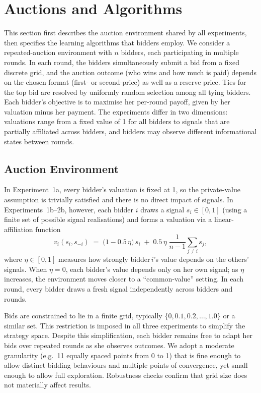 \section{Auctions and Algorithms}
\label{sec:auctions_and_algorithms}
\label{sec:auctions}


This section first describes the auction environment shared by all experiments, then specifies the learning algorithms that bidders employ. We consider a repeated-auction environment with $n$ bidders, each participating in multiple rounds. In each round, the bidders simultaneously submit a bid from a fixed discrete grid, and the auction outcome (who wins and how much is paid) depends on the chosen format (first- or second-price) as well as a reserve price. Ties for the top bid are resolved by uniformly random selection among all tying bidders. Each bidder's objective is to maximise her per-round payoff, given by her valuation minus her payment. The experiments differ in two dimensions: valuations range from a fixed value of 1 for all bidders to signals that are partially affiliated across bidders, and bidders may observe different informational states between rounds.

\subsection{Auction Environment}

In Experiment~1a, every bidder's valuation is fixed at 1, so the private-value assumption is trivially satisfied and there is no direct impact of signals. In Experiments~1b--2b, however, each bidder $i$ draws a signal $s_{i}\in [0,1]$ (using a finite set of possible signal realisations) and forms a valuation via a linear-affiliation function
\[
v_{i}(s_{i}, s_{-i}) \;=\; \bigl(1 - 0.5\,\eta\bigr)\,s_{i} \;+\; 0.5\,\eta\;\frac{1}{n-1}\sum_{j\neq i} s_{j},
\]
where $\eta\in[0,1]$ measures how strongly bidder\,$i$'s value depends on the others' signals. When $\eta=0$, each bidder's value depends only on her own signal; as $\eta$ increases, the environment moves closer to a ``common-value'' setting. In each round, every bidder draws a fresh signal independently across bidders and rounds.


Bids are constrained to lie in a finite grid, typically $\{0,0.1,0.2,\ldots,1.0\}$ or a similar set. This restriction is imposed in all three experiments to simplify the strategy space. Despite this simplification, each bidder remains free to adapt her bids over repeated rounds as she observes outcomes. We adopt a moderate granularity (e.g.\ 11 equally spaced points from 0 to 1) that is fine enough to allow distinct bidding behaviours and multiple points of convergence, yet small enough to allow full exploration. Robustness checks confirm that grid size does not materially affect results.


